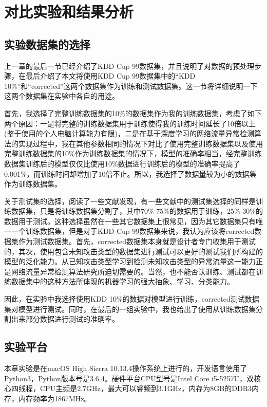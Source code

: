 
\chapter{对比实验和结果分析}

\section{实验数据集的选择}

上一章的最后一节已经介绍了KDD Cup 99数据集，并且说明了对数据的预处理步骤，在最后介绍了本文将使用KDD Cup 99数据集中的“KDD 10\%”和“corrected”这两个数据集作为训练和测试数据集。这一节将详细说明一下这两个数据集在实验中各自的用途。

首先，我选择了完整训练数据集的10\%的数据集作为我的训练数据集，考虑了如下两个原因：一是将完整的训练数据集用于训练使得我的训练时间延长了10倍以上(鉴于使用的个人电脑计算能力有限)，二是在基于深度学习的网络流量异常检测算法的实现过程中，我在其他参数相同的情况下对比了使用完整训练数据集以及使用完整训练数据集的10\%作为训练数据集的情况下，模型的准确率相当，经完整训练数据集训练后的模型仅仅比使用10\%数据进行训练后的模型的准确率提高了0.001\%，而训练时间却增加了10倍不止。所以，我选择了数据量较为小的数据集作为训练数据集。

关于测试集的选择，阅读了一些文献发现，有一些文献中的测试集选择的同样是训练数据集，只是将训练数据集分割了，其中70\%-75\%的数据用于训练，25\%-30\%的数据用于测试。这种选择虽然在一些其它数据集上很常见，因为其它数据集只有唯一一个训练数据集，但是对于KDD Cup 99数据集来说，我认为应该将corrected数据集作为测试数据集。首先，corrected数据集本身就是设计者专门收集用于测试的，其次，使用包含未知攻击类型的数据集进行测试可以更好的测试我们所构建的模型的泛化能力。从已知攻击类型学习到检测未知攻击类型的异常流量这一能力正是网络流量异常检测算法研究所迫切需要的。当然，也不能否认训练、测试都在训练数据集中的这种方法所体现的机器学习的强大抽象、学习、分类能力。

因此，在实验中我选择使用KDD 10\%的数据对模型进行训练，corrected测试数据集对模型进行测试。同时，在最后的一组实验中，我也给出了使用从训练数据集分割出来部分数据进行测试的准确率。

\section{实验平台}

本章实验是在macOS High Sierra 10.13.4操作系统上进行的，开发语言使用了Python3，Python版本号是3.6.4。硬件平台CPU型号是Intel Core i5-5257U，双核心四线程，CPU主频是2.7GHz，最大可以睿频到3.1GHz，内存为8GB的DDR3内存，内存频率为1867MHz。

